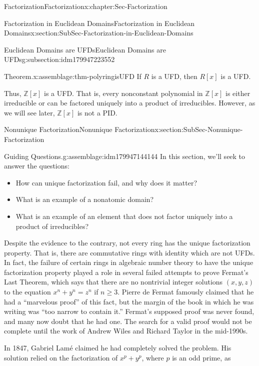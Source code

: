 \documentclass[oneside,10pt,]{book}
\numberwithin{equation}{section}
\renewcommand{\ge}{\geqslant}
\def\Z{{\mathbb Z}}
\begin{document}
\begin{chapterptx}{Factorization}{}{Factorization}{}{}{x:chapter:Sec-Factorization}
\begin{sectionptx}{Factorization in Euclidean Domains}{}{Factorization in Euclidean Domains}{}{}{x:section:SubSec-Factorization-in-Euclidean-Domains}
\begin{subsectionptx}{Euclidean Domains are UFDs}{}{Euclidean Domains are UFDs}{}{}{g:subsection:idm179947223552}
\begin{assemblage}{Theorem.}{x:assemblage:thm-polyringisUFD}%
If \(R\) is a UFD, then \(R[x]\) is a UFD.%
\end{assemblage}
Thus, \(\Z[x]\) is a UFD. That is, every nonconstant polynomial in \(\Z[x]\) is either irreducible or can be factored uniquely into a product of irreducibles.  However, as we will see later, \(\Z[x]\) is not a PID.%
\end{subsectionptx}
\end{sectionptx}
%
%
\typeout{************************************************}
\typeout{************************************************}
%
\begin{sectionptx}{Nonunique Factorization}{}{Nonunique Factorization}{}{}{x:section:SubSec-Nonunique-Factorization}
\begin{assemblage}{Guiding Questions.}{g:assemblage:idm179947144144}%
In this section, we'll seek to answer the questions: %
\begin{itemize}[label=\textbullet]
\item{}How can unique factorization fail, and why does it matter?%
\item{}What is an example of a nonatomic domain?%
\item{}What is an example of an element that does not factor uniquely into a product of irreducibles?%
\end{itemize}
%
\end{assemblage}
Despite the evidence to the contrary, not every ring has the unique factorization property. That is, there are commutative rings with identity which are not UFDs.  In fact, the failure of certain rings in algebraic number theory to have the unique factorization property played a role in several failed attempts to prove Fermat's Last Theorem, which says that there are no nontrivial integer solutions \((x,y,z)\) to the equation \(x^n + y^n = z^n\) if \(n \ge 3\). Pierre de Fermat famously claimed that he had a ``marvelous proof'' of this fact, but the margin of the book in which he was writing was ``too narrow to contain it.'' Fermat's supposed proof was never found, and many now doubt that he had one. The search for a valid proof would not be complete until the work of Andrew Wiles and Richard Taylor in the mid-1990s.%
\par
In 1847, Gabriel Lamé claimed he had completely solved the problem. His solution relied on the factorization of \(x^p + y^p\), where \(p\) is an odd prime, as%
\begin{equation*}

\end{equation*}
\end{sectionptx}
\end{chapterptx}
\end{document}
